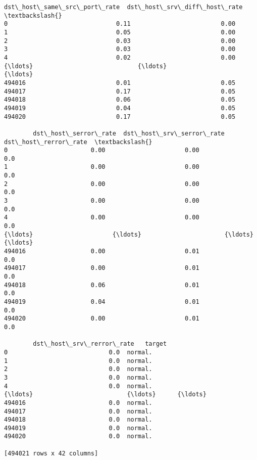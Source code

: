 \documentclass[11pt]{article}
\begin{document}
\begin{tcolorbox}[breakable, size=fbox, boxrule=.5pt, pad at break*=1mm, opacityfill=0]
\begin{Verbatim}[commandchars=\\\{\}]
        dst\_host\_same\_src\_port\_rate  dst\_host\_srv\_diff\_host\_rate  \textbackslash{}
0                              0.11                         0.00
1                              0.05                         0.00
2                              0.03                         0.00
3                              0.03                         0.00
4                              0.02                         0.00
{\ldots}                             {\ldots}                          {\ldots}
494016                         0.01                         0.05
494017                         0.17                         0.05
494018                         0.06                         0.05
494019                         0.04                         0.05
494020                         0.17                         0.05

        dst\_host\_serror\_rate  dst\_host\_srv\_serror\_rate  dst\_host\_rerror\_rate  \textbackslash{}
0                       0.00                      0.00                   0.0
1                       0.00                      0.00                   0.0
2                       0.00                      0.00                   0.0
3                       0.00                      0.00                   0.0
4                       0.00                      0.00                   0.0
{\ldots}                      {\ldots}                       {\ldots}                   {\ldots}
494016                  0.00                      0.01                   0.0
494017                  0.00                      0.01                   0.0
494018                  0.06                      0.01                   0.0
494019                  0.04                      0.01                   0.0
494020                  0.00                      0.01                   0.0

        dst\_host\_srv\_rerror\_rate   target
0                            0.0  normal.
1                            0.0  normal.
2                            0.0  normal.
3                            0.0  normal.
4                            0.0  normal.
{\ldots}                          {\ldots}      {\ldots}
494016                       0.0  normal.
494017                       0.0  normal.
494018                       0.0  normal.
494019                       0.0  normal.
494020                       0.0  normal.

[494021 rows x 42 columns]
\end{Verbatim}
\end{tcolorbox}
        
\end{document}
